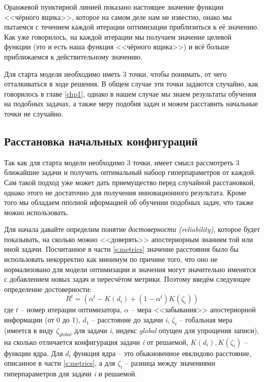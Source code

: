 \documentclass[times,specification,annotation]{itmo-student-thesis}
\begin{document}
	Оранжевой пунктирной линией показано настоящее значение функции <<чёрного ящика>>, которое на самом деле нам не известно, онако мы пытаемся с течением каждой итерации оптимизации приблизиться к её значению. Как уже говорилось, на каждой итерации мы получаем значение целевой функции (это и есть наша функция <<чёрного ящика>>) и всё больше приближаемся к действительному значению. \par
	Для старта модели необходимо иметь 3 точки, чтобы понимать, от чего отталкиваться в ходе решения. В общем случае эти точки задаются случайно, как говорилось в главе \ref{chp1}, однако в нашем случае мы знаем результаты обучения на подобных задачах, а также меру подобия задач и можем расставить начальные точки не случайно.
	\subsection{Расстановка начальных конфигураций}
	Так как для старта модели необходимо 3 точки, имеет смысл рассмотреть 3 ближайшие задачи и получить оптимальный набоор гиперпараметров от каждой. Сам такой подход уже может дать приемущество перед случайной расстановкой, однако этого не достаточно для получения инновационного результата. Кроме того мы обладаем пполной иформацией об обучении подобных задач, что также можно использовать. \par 
	Для начала давайте определим понятие \textit{достоверности (reliability)}, которое будет показывать, на сколько можно <<доверять>> апостериорным знаниям той или иной задачи. Посчитанное в части \ref{s:metrics} значение расстояния было бы использовать некорректно как минимум по причине того, что оно не нормализовано для модели оптимизации и значения могут значительно именятся с добавлением новых задач и пересчётом метрики. Поэтому введём следующее определение достоверности:
	\begin{equation}
	\mathit R^{t}=(\alpha^{t}-K(d_{i})+(1-\alpha^{t})K(\zeta_{i}))
	\label{eq:rel}
	\end{equation}
	где $ t $ -- номер итерации оптимизатора, $ \alpha $ -- мера <<забывания>> апостериорной информации (от 0 до 1), $ d_{1} $ -- расстояние до задачи \textit{i}, $ \zeta_{i} $ -- гобальная мера (имеется в виду $ \zeta_{global}  $ для задачи \textit{i}, индекс \textit{global} опущен для упрощения записи), на сколько отличается конфигурация задачи \textit{i} от решаемой, $ K(d_{i}), K(\zeta_{i})$ -- функции ядра. Для $ d_{i} $ функция ядра -- это обыкновенное евклидово расстояние, описанное в части \ref{s:metrics}, а  для $ \zeta_{i} $ -- разница между значениями гиперпараметров для задачи \textit{i} и решаемой. \par 
\end{document}
